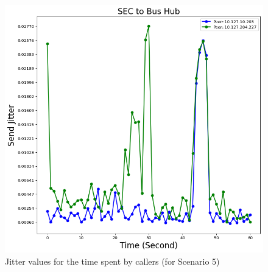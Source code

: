 	\begin{figure}[tbh]
		\begin{minipage}{\textwidth}
			\includegraphics[scale=0.38]{Images/experiment/senarios/df_bus_hub.png}
		\end{minipage}
		\caption{Jitter values for the time spent by callers (for Scenario 5)}
		\label{fig:scene-out-5}
	\end{figure}